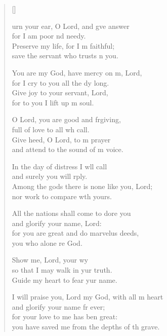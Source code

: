 \settowidth{\versewidth}{I will praise you, Lord my God, with all my heart}
\begin{verse}[\versewidth]
  \begin{patverse}
urn your ear, O Lord, and g\pointup{\i}ve answer\Med\\
for I am poor nd needy.\\
Preserve my life, for I m faithful;\Med\\
save the servant who trusts \pointup{\i}n you.

You are my God, have mercy on m, Lord,\Med\\
for I cry to you all the dy long.\\
Give joy to your servant,  Lord,\Med\\
for to you I lift up m soul.

O Lord, you are good and frgiving,\Med\\
full of love to all wh call.\\
Give heed, O Lord, to m prayer\Med\\
and attend to the sound of m voice.

In the day of distress I w\pointup{\i}ll call\Med\\
and surely you will rply.\\
Among the gods there is none like you,  Lord;\Med\\
nor work to compare w\pointup{\i}th yours.

All the nations shall come to dore you\Med\\
and glorify your name,  Lord:\\
for you are great and do marvelus deeds,\Med\\
you who alone re God.

Show me, Lord, your wy\Flex\\
so that I may walk in yur truth.\Med\\
Guide my heart to fear yur name.

I will praise you, Lord my God, with all m heart\Med\\
and glorify your name fr ever;\\
for your love to me has ben great:\Med\\
you have saved me from the depths of th grave.


\end{patverse}
\end{verse}
